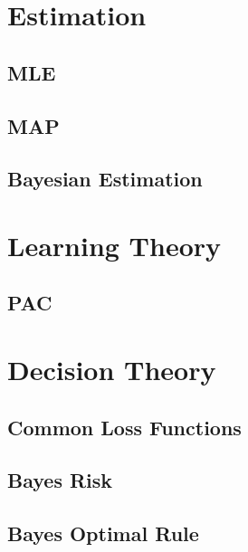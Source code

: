 \documentclass[18pt,a3paper,landscape, ncols=2]{cheatsheet}
\begin{document}
\section{Estimation} \seperator
	\subsection{MLE}
		\begin{mdframed}
		\end{mdframed}
	\subsection{MAP}
		\begin{mdframed}
		\end{mdframed}
	\subsection{Bayesian Estimation}
		\begin{mdframed}
		\end{mdframed}

\section{Learning Theory} \seperator
	\subsection{PAC}
		\begin{mdframed}
		\end{mdframed}
		
\section{Decision Theory} \seperator
	\subsection{Common Loss Functions}
		\begin{mdframed}
		\end{mdframed}
	\subsection{Bayes Risk}
		\begin{mdframed}
		\end{mdframed}
	\subsection{Bayes Optimal Rule}
		\begin{mdframed}
		\end{mdframed}
\end{document}

